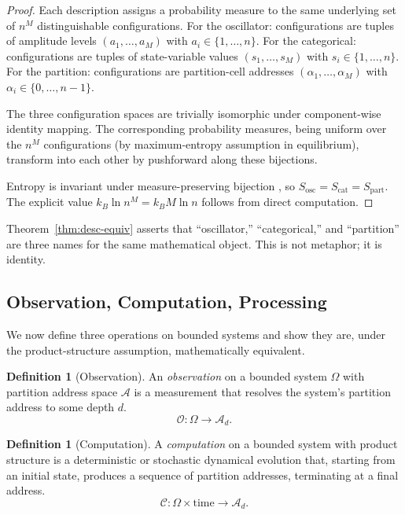 \documentclass[11pt,twocolumn,a4paper]{article}
\theoremstyle{definition}
\newtheorem{definition}[theorem]{Definition}
\theoremstyle{remark}
\newcommand{\Oc}{\mathcal{O}}
\newcommand{\Cc}{\mathcal{C}}
\newcommand{\Ac}{\mathcal{A}}
\begin{document}
\begin{proof}
Each description assigns a probability measure to the same underlying set of $n^M$ distinguishable configurations. For the oscillator: configurations are tuples of amplitude levels $(a_1, \ldots, a_M)$ with $a_i \in \{1, \ldots, n\}$. For the categorical: configurations are tuples of state-variable values $(s_1, \ldots, s_M)$ with $s_i \in \{1, \ldots, n\}$. For the partition: configurations are partition-cell addresses $(\alpha_1, \ldots, \alpha_M)$ with $\alpha_i \in \{0, \ldots, n-1\}$.

The three configuration spaces are trivially isomorphic under component-wise identity mapping. The corresponding probability measures, being uniform over the $n^M$ configurations (by maximum-entropy assumption in equilibrium), transform into each other by pushforward along these bijections.

Entropy is invariant under measure-preserving bijection \citep{cover2006elements}, so $S_{\text{osc}} = S_{\text{cat}} = S_{\text{part}}$. The explicit value $k_B \ln n^M = k_B M \ln n$ follows from direct computation.
\end{proof}

Theorem~\ref{thm:desc-equiv} asserts that ``oscillator,'' ``categorical,'' and ``partition'' are three names for the same mathematical object. This is not metaphor; it is identity.

\subsection{Observation, Computation, Processing}

We now define three operations on bounded systems and show they are, under the product-structure assumption, mathematically equivalent.

\begin{definition}[Observation]
\label{def:obs}
An \emph{observation} on a bounded system $\Omega$ with partition address space $\Ac$ is a measurement that resolves the system's partition address to some depth $d$.
\[
\Oc: \Omega \to \Ac_d.
\]
\end{definition}

\begin{definition}[Computation]
\label{def:comp}
A \emph{computation} on a bounded system with product structure is a deterministic or stochastic dynamical evolution that, starting from an initial state, produces a sequence of partition addresses, terminating at a final address.
\[
\Cc: \Omega \times \text{time} \to \Ac_d.
\]
\end{definition}
\end{document}

